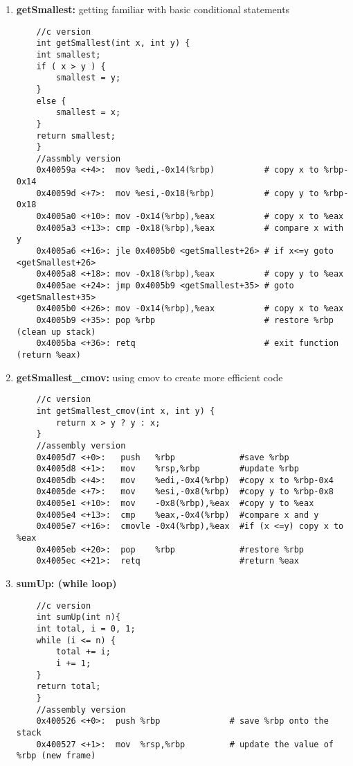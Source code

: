 \documentclass{article}
\begin{document}
\begin{enumerate}
    \item \textbf{getSmallest:} getting familiar with basic conditional statements
    \begin{verbatim}
    //c version
    int getSmallest(int x, int y) {
    int smallest;
    if ( x > y ) {
        smallest = y;
    }
    else {
        smallest = x;
    }
    return smallest;
    }
    //assmbly version
    0x40059a <+4>:  mov %edi,-0x14(%rbp)          # copy x to %rbp-0x14
    0x40059d <+7>:  mov %esi,-0x18(%rbp)          # copy y to %rbp-0x18
    0x4005a0 <+10>: mov -0x14(%rbp),%eax          # copy x to %eax
    0x4005a3 <+13>: cmp -0x18(%rbp),%eax          # compare x with y
    0x4005a6 <+16>: jle 0x4005b0 <getSmallest+26> # if x<=y goto <getSmallest+26>
    0x4005a8 <+18>: mov -0x18(%rbp),%eax          # copy y to %eax
    0x4005ae <+24>: jmp 0x4005b9 <getSmallest+35> # goto <getSmallest+35>
    0x4005b0 <+26>: mov -0x14(%rbp),%eax          # copy x to %eax
    0x4005b9 <+35>: pop %rbp                      # restore %rbp (clean up stack)
    0x4005ba <+36>: retq                          # exit function (return %eax)
    \end{verbatim}
    \item \textbf{getSmallest\_cmov:} using cmov to create more efficient code
    \begin{verbatim}
    //c version
    int getSmallest_cmov(int x, int y) {
        return x > y ? y : x;
    }
    //assembly version
    0x4005d7 <+0>:   push   %rbp             #save %rbp
    0x4005d8 <+1>:   mov    %rsp,%rbp        #update %rbp
    0x4005db <+4>:   mov    %edi,-0x4(%rbp)  #copy x to %rbp-0x4
    0x4005de <+7>:   mov    %esi,-0x8(%rbp)  #copy y to %rbp-0x8
    0x4005e1 <+10>:  mov    -0x8(%rbp),%eax  #copy y to %eax
    0x4005e4 <+13>:  cmp    %eax,-0x4(%rbp)  #compare x and y
    0x4005e7 <+16>:  cmovle -0x4(%rbp),%eax  #if (x <=y) copy x to %eax
    0x4005eb <+20>:  pop    %rbp             #restore %rbp
    0x4005ec <+21>:  retq                    #return %eax
    \end{verbatim}
    \item \textbf{sumUp: (while loop)} 
    \begin{verbatim}
    //c version
    int sumUp(int n){
    int total, i = 0, 1;
    while (i <= n) {
        total += i;
        i += 1;
    }
    return total;
    }
    //assembly version
    0x400526 <+0>:  push %rbp              # save %rbp onto the stack
    0x400527 <+1>:  mov  %rsp,%rbp         # update the value of %rbp (new frame)

\end{verbatim}
\end{enumerate}
\end{document}
